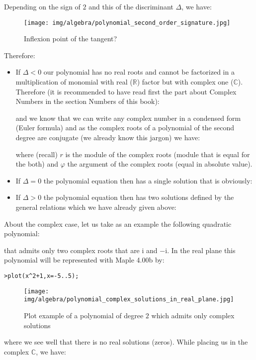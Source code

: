	
	Depending on the sign of $2$ and this of the discriminant $\Delta$, we have:
	\begin{figure}[H]
		\centering
		\texttt{[image: img/algebra/polynomial\_second\_order\_signature.jpg]}
		\caption{Inflexion point of the tangent?}
	\end{figure}
	Therefore:
	\begin{itemize}
		\item If $\Delta<0$ our polynomial has no real roots and cannot be factorized in a multiplication of monomial with real ($
\mathbb{R}$) factor but with complex one ($\mathbb{C}$). Therefore (it is recommended to have read first the part about Complex Numbers in the section Numbers of this book):
		
		and we know that we can write any complex number in a condensed form (Euler formula) and as the complex roots of a polynomial of the second degree are conjugate (we already know this jargon) we have:
		
		where (recall) $r$ is the module of the complex roots (module that is equal for the both) and $\varphi$ the argument of the complex roots (equal in absolute value).
		
		\item If $\Delta=0$ the polynomial equation then has a single solution that is obviously:
		
		
		\item If $\Delta>0$ the polynomial equation then has two solutions defined by the general relations which we have already given above:
		
	\end{itemize}
	About the complex case, let us take as an example the following quadratic polynomial:
	
	that admits only two complex roots that are $\mathrm{i}$ and $-\mathrm{i}$. In the real plane this polynomial will be represented with Maple 4.00b by:
	
	\texttt{>plot(x\string^2+1,x=-5..5);}
	\begin{figure}[H]
		\centering
		\texttt{[image: img/algebra/polynomial\_complex\_solutions\_in\_real\_plane.jpg]}
		\caption[]{Plot example of a polynomial of degree $2$ which admits only complex solutions}
	\end{figure}
	where we see well that there is no real solutions (zeros). While  placing us in the complex $\mathbb{C}$, we have:
	
